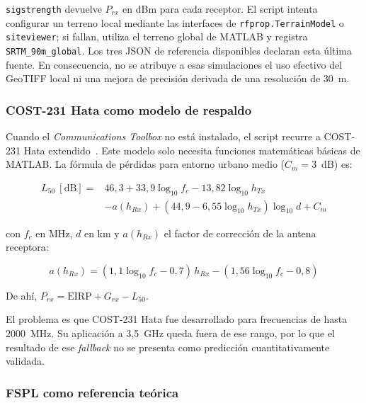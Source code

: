 \texttt{sigstrength} devuelve $P_{rx}$ en dBm para cada receptor. El script intenta
configurar un terreno local mediante las interfaces de \texttt{rfprop.TerrainModel} o
\texttt{siteviewer}; si fallan, utiliza el terreno global de MATLAB y registra
\texttt{SRTM\_90m\_global}. Los tres JSON de referencia disponibles declaran esta última
fuente. En consecuencia, no se atribuye a esas simulaciones el uso efectivo del GeoTIFF
local ni una mejora de precisión derivada de una resolución de 30~m.

\subsubsection{COST-231 Hata como modelo de respaldo}
\label{sec:matlab_cost231}

Cuando el \textit{Communications Toolbox} no está instalado, el script recurre a COST-231
Hata extendido~\cite{cost231finalreport1999}. Este modelo solo necesita funciones
matemáticas básicas de MATLAB. La fórmula de
pérdidas para entorno urbano medio ($C_m = 3$~dB) es:

\begin{equation}
\begin{split}
L_{50}~[\text{dB}] ={}& 46{,}3 + 33{,}9 \log_{10}f_c - 13{,}82 \log_{10}h_{Tx} \\
                      &- a(h_{Rx}) + (44{,}9 - 6{,}55 \log_{10}h_{Tx})\log_{10}d + C_m
\end{split}
\label{eq:cost231}
\end{equation}

con $f_c$ en MHz, $d$ en km y $a(h_{Rx})$ el factor de corrección de la antena receptora:

\begin{equation}
a(h_{Rx}) = (1{,}1 \log_{10}f_c - 0{,}7)\,h_{Rx} - (1{,}56 \log_{10}f_c - 0{,}8)
\label{eq:a_hrx}
\end{equation}

De ahí, $P_{rx} = \text{EIRP} + G_{rx} - L_{50}$.

El problema es que COST-231 Hata fue desarrollado para frecuencias de hasta 2000~MHz.
Su aplicación a 3,5~GHz queda fuera de ese rango, por lo que el resultado de ese
\textit{fallback} no se presenta como predicción cuantitativamente validada.

\subsubsection{FSPL como referencia teórica}
\label{sec:matlab_fspl}


